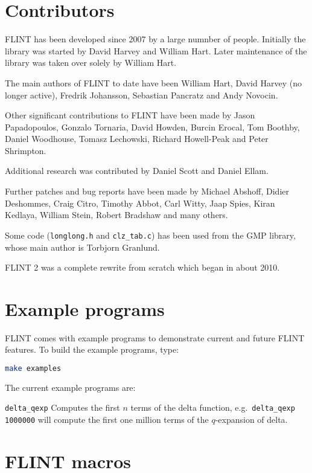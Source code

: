 \documentclass[a4paper,10pt]{book}
\newcommand{\code}{\lstinline}
\begin{document}
\chapter{Contributors}

FLINT has been developed since 2007 by a large numnber of people. Initially
the library was started by David Harvey and William Hart. Later maintenance
of the library was taken over solely by William Hart.

The main authors of FLINT to date have been William Hart, David Harvey (no
longer active), Fredrik Johansson, Sebastian Pancratz and Andy Novocin.

Other significant contributions to FLINT have been made by Jason Papadopoulos,
Gonzalo Tornaria, David Howden, Burcin Erocal, Tom Boothby, Daniel Woodhouse, 
Tomasz Lechowski, Richard Howell-Peak and Peter Shrimpton.

Additional research was contributed by Daniel Scott and Daniel Ellam.

Further patches and bug reports have been made by Michael Abshoff, Didier 
Deshommes, Craig Citro, Timothy Abbot, Carl Witty, Jaap Spies, Kiran 
Kedlaya, William Stein, Robert Bradshaw and many others.

Some code (\code{longlong.h} and \code{clz_tab.c}) has been used from
the GMP library, whose main author is Torbjorn Granlund.

FLINT 2 was a complete rewrite from scratch which began in about 2010.
 
\chapter{Example programs}

FLINT comes with example programs to demonstrate current and future FLINT 
features.  To build the example programs, type:

\begin{lstlisting}[language=bash]
make examples
\end{lstlisting}

The current example programs are:

\code{delta_qexp}  Computes the first $n$ terms of the delta function, e.g.\ 
\code{delta_qexp 1000000} will compute the first one million terms of the 
$q$-expansion of delta.

\chapter{FLINT macros}
\end{document}
